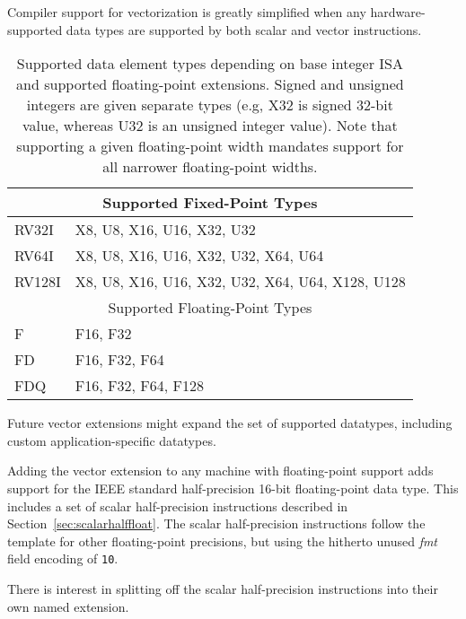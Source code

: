 \begin{commentary}
  Compiler support for vectorization is greatly simplified when any
  hardware-supported data types are supported by both scalar and
  vector instructions.
\end{commentary}

\begin{table}
  \centering
\begin{tabular}{|l|l|}
  \hline
  \multicolumn{2}{|c|}{Supported Fixed-Point Types} \\
  \hline
  RV32I  & X8, U8, X16, U16, X32, U32 \\
  RV64I  & X8, U8, X16, U16, X32, U32, X64, U64 \\
  RV128I & X8, U8, X16, U16, X32, U32, X64, U64, X128, U128 \\
  \hline
  \hline
  \multicolumn{2}{|c|}{Supported Floating-Point Types} \\
  \hline
  F      & F16, F32 \\
  FD     & F16, F32, F64 \\
  FDQ    & F16, F32, F64, F128 \\
  \hline
\end{tabular}
\caption{Supported data element types depending on base integer ISA
  and supported floating-point extensions.  Signed and unsigned
  integers are given separate types (e.g, X32 is signed 32-bit value,
  whereas U32 is an unsigned integer value). Note that supporting a
  given floating-point width mandates support for all narrower
  floating-point widths.}
\label{tab:velemtypes}
\end{table}

\begin{commentary}
  Future vector extensions might expand the set of supported
  datatypes, including custom application-specific datatypes.
\end{commentary}

Adding the vector extension to any machine with floating-point support
adds support for the IEEE standard half-precision 16-bit
floating-point data type.  This includes a set of scalar
half-precision instructions described in
Section~\ref{sec:scalarhalffloat}.  The scalar half-precision
instructions follow the template for other floating-point precisions,
but using the hitherto unused {\em fmt} field encoding of {\tt 10}.

\begin{commentary}
  There is interest in splitting off the scalar half-precision
  instructions into their own named extension.
\end{commentary}


